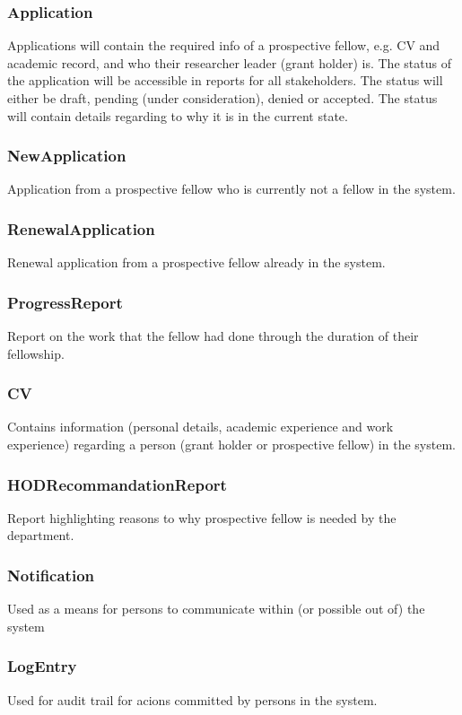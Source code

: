\documentclass[12pt]{article}
\begin{document}
\subsubsection{Application}
Applications will contain the required info of a prospective fellow, e.g. CV and academic record, and who their researcher leader (grant holder) is. The status of the application will be accessible in reports for all stakeholders. The status will either be draft, pending (under consideration), denied or accepted. The status will contain details regarding to why it is in the current state.

\subsubsection{NewApplication}
Application from a prospective fellow who is currently not a fellow in the system.

\subsubsection{RenewalApplication}
Renewal application from a prospective fellow already in the system.

\subsubsection{ProgressReport}
Report on the work that the fellow had done through the duration of their fellowship.

\subsubsection{CV}
Contains information (personal details, academic experience and work experience) regarding a person (grant holder or prospective fellow) in the system.

\subsubsection{HODRecommandationReport}
Report highlighting reasons to why prospective fellow is needed by the department.

\subsubsection{Notification}
Used as a means for persons to communicate within (or possible out of)  the system

\subsubsection{LogEntry}
Used for audit trail for acions committed by persons in the system.
\end{document}
